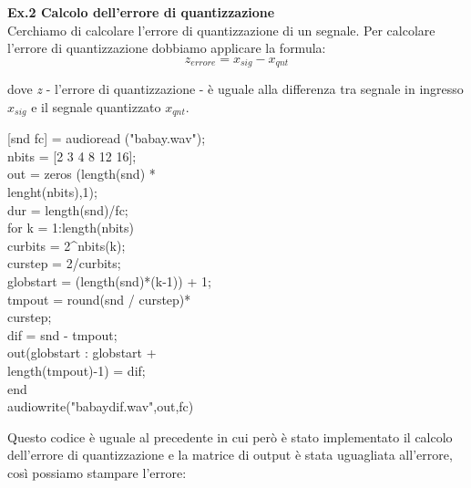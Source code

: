 \documentclass[11pt]{article}
\begin{document}
\begin{multicols*}{2}
\vspace{3cm}

\textbf{\textsf {Ex.2 Calcolo dell'errore di quantizzazione}}\\

\noindent Cerchiamo di calcolare l'errore di quantizzazione di un segnale. Per calcolare l'errore di quantizzazione dobbiamo applicare la formula:
\[
z_{errore} = x_{sig} - x_{qnt}
\]

dove \textit z - l'errore di quantizzazione - è uguale alla differenza tra segnale in ingresso \textit {$x_{sig}$} e il segnale quantizzato \textit {$x_{qnt}$}.

\begin{center}
\begin{minipage}[c]{6.3cm}
\begin{sffamily}

[snd fc] = audioread ("babay.wav");\\
nbits = [2 3 4 8 12 16];\\
out = zeros (length(snd) * \\
lenght(nbits),1);\\
dur = length(snd)/fc;\\

for k = 1:length(nbits)\\
curbits = 2\textasciicircum nbits(k);\\
curstep = 2/curbits;\\
globstart = (length(snd)*(k-1)) + 1;\\
tmpout = round(snd / curstep)*\\
curstep;\\
dif = snd - tmpout;\\
out(globstart : globstart + \\
length(tmpout)-1) = dif;\\
end\\
audiowrite("babaydif.wav",out,fc)\\

\end{sffamily}
\end{minipage}
\end{center}

Questo codice è uguale al precedente in cui però è stato implementato il calcolo dell'errore di quantizzazione e la matrice di output è stata uguagliata all'errore, così possiamo stampare l'errore:

\begin{center}
\begin{minipage}[c]{6.3cm}
\begin{sffamily}


\end{sffamily}
\end{minipage}
\end{center}
\end{multicols*}
\end{document}
